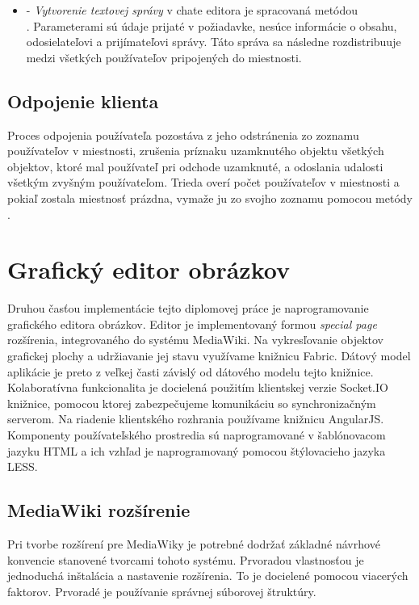 \begin{itemize}
	\item {} - \textit{Vytvorenie textovej správy} v chate editora je spracovaná metódou \\ . Parameterami sú údaje prijaté v požiadavke, nesúce informácie o obsahu, odosielateľovi a prijímateľovi správy. Táto správa sa následne rozdistribuuje medzi všetkých používateľov pripojených do miestnosti.
	
\end{itemize}

\subsection{Odpojenie klienta}
Proces odpojenia používateľa pozostáva z jeho odstránenia zo zoznamu používateľov v miestnosti, zrušenia príznaku uzamknutého objektu všetkých objektov, ktoré mal používateľ pri odchode uzamknuté, a odoslania udalosti všetkým zvyšným používateľom. Trieda  overí počet používateľov v miestnosti a pokiaľ zostala miestnosť prázdna, vymaže ju zo svojho zoznamu pomocou metódy .





\section{Grafický editor obrázkov}
Druhou časťou implementácie tejto diplomovej práce je naprogramovanie grafického editora obrázkov. Editor je implementovaný formou \textit{special page} rozšírenia, integrovaného do systému MediaWiki. Na vykresľovanie objektov grafickej plochy a udržiavanie jej stavu využívame knižnicu Fabric. Dátový model aplikácie je preto z veľkej časti závislý od dátového modelu tejto knižnice. Kolaboratívna funkcionalita je docielená použitím klientskej verzie Socket.IO knižnice, pomocou ktorej zabezpečujeme komunikáciu so synchronizačným serverom. Na riadenie klientského rozhrania používame knižnicu AngularJS. Komponenty používateľského prostredia sú naprogramované v šablónovacom jazyku HTML a ich vzhľad je naprogramovaný pomocou štýlovacieho jazyka LESS.

\subsection{MediaWiki rozšírenie}
Pri tvorbe rozšírení pre MediaWiky je potrebné dodržať základné návrhové konvencie stanovené tvorcami tohoto systému. Prvoradou vlastnosťou je jednoduchá inštalácia a nastavenie rozšírenia. To je docielené pomocou viacerých faktorov. Prvoradé je používanie správnej súborovej štruktúry. 

